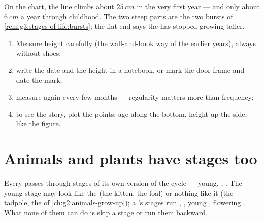 \begin{example}\label{ex:g3:stages-of-life:reading}
On the chart, the line climbs about $\qty{25}{cm}$ in the very
first year --- and only about $\qty{6}{cm}$ a year through
childhood. The two steep parts are the two bursts of
\cref{rem:g3:stages-of-life:bursts}; the flat end says the 
has stopped growing taller.
\end{example}

\begin{method}\label{met:g3:stages-of-life:keep}
\begin{enumerate}
  \item Measure height carefully (the wall-and-book way of the
        earlier years), always without shoes;
  \item write the date and the height in a notebook, or mark the
        door frame and date the mark;
  \item measure again every few months --- regularity matters
        more than frequency;
  \item to see the story, plot the points: age along the bottom,
        height up the side, like the figure.
\end{enumerate}
\end{method}

\section{Animals and plants have stages too}

\begin{proposition}\label{prop:g3:stages-of-life:animals}
Every  passes through stages of its own version of
the cycle --- young, , . The young stage may look
like the  (the kitten, the foal) or nothing like it (the
tadpole, the  of \cref{ch:g2:animals-grow-up}); a
's stages run , , young , flowering .
What none of them can do is skip a stage or run them backward.
\end{proposition}
\admitted


